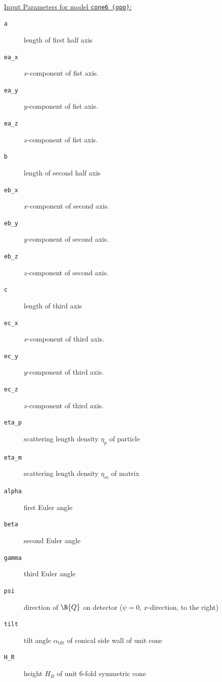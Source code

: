 ~\\
\underline{Input Parameters for model \texttt{cone6 (opo)}:}
\begin{description}
\item[\texttt{a}] length of first half axis
\item[\texttt{ea\_x}] $x$-component of fist axis.
\item[\texttt{ea\_y}] $y$-component of fist axis.
\item[\texttt{ea\_z}] $z$-component of fist axis.
\item[\texttt{b}] length of second half axis
\item[\texttt{eb\_x}] $x$-component of second axis.
\item[\texttt{eb\_y}] $y$-component of second axis.
\item[\texttt{eb\_z}] $z$-component of second axis.
\item[\texttt{c}] length of third axis
\item[\texttt{ec\_x}] $x$-component of third axis.
\item[\texttt{ec\_y}] $y$-component of third axis.
\item[\texttt{ec\_z}] $z$-component of third axis.
\item[\texttt{eta\_p}] scattering length density $\eta_p$ of particle
\item[\texttt{eta\_m}] scattering length density $\eta_m$ of matrix
\item[\texttt{alpha}] first Euler angle
\item[\texttt{beta}] second Euler angle
\item[\texttt{gamma}] third Euler angle
\item[\texttt{psi}] direction of $\B{Q}$ on detector ($\psi=0$, $x$-direction, to the right)
\item[\texttt{tilt}] tilt angle $\alpha_\mathrm{tilt}$ of conical side wall of unit cone
\item[\texttt{H\_R}] height $H_R$ of unit 6-fold symmetric cone
\end{description}

